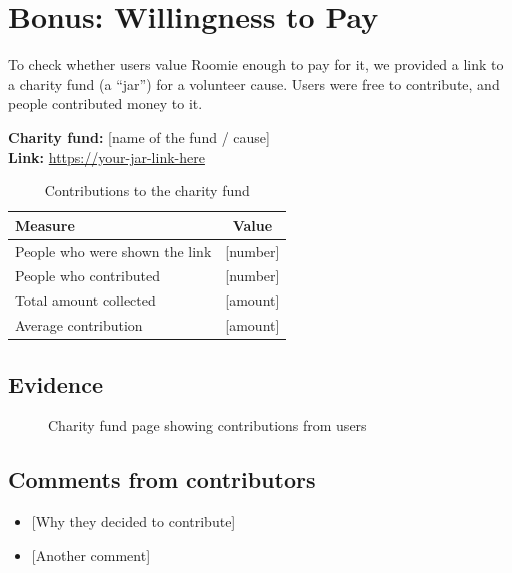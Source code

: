 \documentclass[11pt,a4paper]{article}
\begin{document}
\section{Bonus: Willingness to Pay}
To check whether users value Roomie enough to pay for it, we provided a link to a
charity fund (a ``jar'') for a volunteer cause. Users were free to contribute, and
people contributed money to it.

\textbf{Charity fund:} [name of the fund / cause] \\
\textbf{Link:} \url{https://your-jar-link-here}

\begin{table}[h]
\centering
\begin{tabularx}{0.8\textwidth}{X c}
\toprule
\textbf{Measure} & \textbf{Value} \\
\midrule
People who were shown the link & [number] \\
People who contributed & [number] \\
Total amount collected & [amount] \\
Average contribution & [amount] \\
\bottomrule
\end{tabularx}
\caption{Contributions to the charity fund}
\end{table}

\subsection{Evidence}
\begin{figure}[h]
\centering
\caption{Charity fund page showing contributions from users}
\end{figure}

\subsection{Comments from contributors}
\begin{itemize}[noitemsep]
  \item {[Why they decided to contribute]}
  \item {[Another comment]}
\end{itemize}
\end{document}
